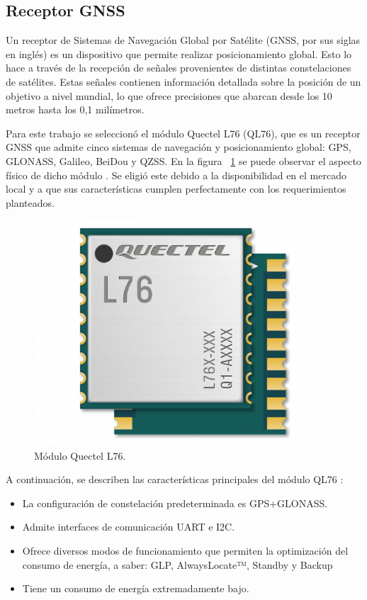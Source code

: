 \subsection{Receptor GNSS}
\label{sec:QL76}

Un receptor de Sistemas de Navegación Global por Satélite (GNSS, por sus siglas en inglés) es un dispositivo que permite realizar posicionamiento global. Esto lo hace a través de la recepción de señales provenientes de distintas constelaciones de satélites. Estas señales contienen información detallada sobre la posición de un objetivo a nivel mundial, lo que ofrece precisiones que abarcan desde los 10 metros hasta los 0,1 milímetros.  

Para este trabajo se seleccionó el módulo Quectel L76 (QL76), que es un receptor GNSS que admite cinco sistemas de navegación y posicionamiento global: GPS, GLONASS, Galileo, BeiDou y QZSS. En la figura ~\ref{fig:QL76} se puede observar el aspecto físico de dicho módulo \citep{QL76}. Se eligió este debido a la disponibilidad en el mercado local y a que sus características cumplen perfectamente con los requerimientos planteados. 

\vspace{1cm}

\begin{figure}[htbp]
	\centering
	\includegraphics[width=.5\textwidth]{./Figures/QL76.png}
	\caption{Módulo Quectel L76\protect\footnotemark.}
	\label{fig:QL76}
\end{figure}

A continuación, se describen las características principales del módulo QL76 \citep{QL76}:

\begin{itemize}
    \item La configuración de constelación predeterminada es GPS+GLONASS.
    \item Admite interfaces de comunicación UART e I2C. 
    \item Ofrece diversos modos de funcionamiento que permiten la optimización del consumo de energía, a saber: GLP, AlwaysLocate™, Standby y Backup
    \item Tiene un consumo de energía extremadamente bajo.
\end{itemize}

